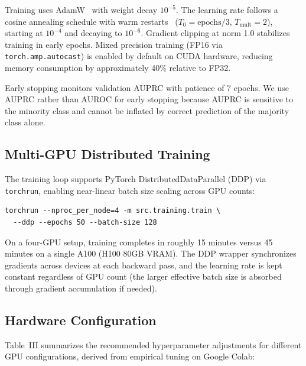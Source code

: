 \documentclass[10pt,conference,letterpaper]{IEEEtran}
\begin{document}
Training uses AdamW~\cite{AdamW} with weight decay $10^{-5}$. The learning rate follows
a cosine annealing schedule with warm restarts~\cite{CosineAnnealing} ($T_0 =
\text{epochs}/3$, $T_\text{mult}=2$), starting at $10^{-4}$ and decaying to $10^{-6}$.
Gradient clipping at norm 1.0 stabilizes training in early epochs. Mixed precision
training (FP16 via \texttt{torch.amp.autocast}) is enabled by default on CUDA hardware,
reducing memory consumption by approximately 40\% relative to FP32.

Early stopping monitors validation AUPRC with patience of 7 epochs. We use AUPRC rather
than AUROC for early stopping because AUPRC is sensitive to the minority class and
cannot be inflated by correct prediction of the majority class alone.

\subsection{Multi-GPU Distributed Training}

The training loop supports PyTorch DistributedDataParallel (DDP) via
\texttt{torchrun}, enabling near-linear batch size scaling across GPU counts:

\begin{lstlisting}[basicstyle=\small\ttfamily, breaklines=true]
torchrun --nproc_per_node=4 -m src.training.train \
  --ddp --epochs 50 --batch-size 128
\end{lstlisting}

On a four-GPU setup, training completes in roughly 15 minutes versus 45 minutes on a
single A100 (H100 80GB VRAM). The DDP wrapper synchronizes gradients across devices at
each backward pass, and the learning rate is kept constant regardless of GPU count
(the larger effective batch size is absorbed through gradient accumulation if needed).

\subsection{Hardware Configuration}

Table~III summarizes the recommended hyperparameter adjustments for different GPU
configurations, derived from empirical tuning on Google Colab:
\end{document}
